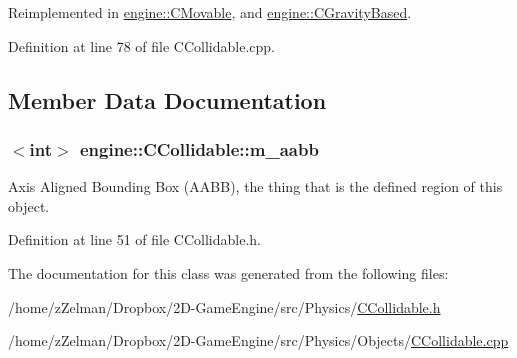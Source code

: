 Reimplemented in \hyperlink{classengine_1_1CMovable_a18299a0373464c4e1aadcdc9824eed9a}{engine\-::\-C\-Movable}, and \hyperlink{classengine_1_1CGravityBased_a1fd898d6529eeb9bb8651d7d9bcdb89c}{engine\-::\-C\-Gravity\-Based}.



Definition at line 78 of file C\-Collidable.\-cpp.



\subsection{Member Data Documentation}
\hypertarget{classengine_1_1CCollidable_aca283a2f940e99dcd6b0f57e7812968d}{
\subsubsection[{m\-\_\-aabb}]{$<$int$>$ engine\-::\-C\-Collidable\-::m\-\_\-aabb\hspace{0.3cm}{\ttfamily [protected]}}}\label{classengine_1_1CCollidable_aca283a2f940e99dcd6b0f57e7812968d}


Axis Aligned Bounding Box (A\-A\-B\-B), the thing that is the defined region of this object. 



Definition at line 51 of file C\-Collidable.\-h.



The documentation for this class was generated from the following files\-:\begin{DoxyCompactItemize}
\item 
/home/z\-Zelman/\-Dropbox/2\-D-\/\-Game\-Engine/src/\-Physics/\hyperlink{CCollidable_8h}{C\-Collidable.\-h}\item 
/home/z\-Zelman/\-Dropbox/2\-D-\/\-Game\-Engine/src/\-Physics/\-Objects/\hyperlink{CCollidable_8cpp}{C\-Collidable.\-cpp}\end{DoxyCompactItemize}
